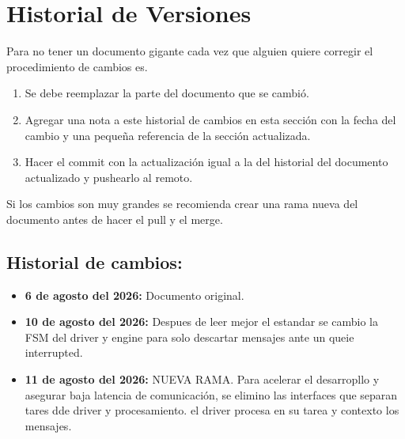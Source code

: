 \thispagestyle{plain}
\chapter[Historial de Versiones]{Historial de Versiones}
\label{cp:historialVersiones}

Para no tener un documento gigante cada vez que alguien quiere corregir el procedimiento de cambios es.
\begin{enumerate}
    \item Se debe reemplazar la parte del documento que se cambió.
    \item Agregar una nota a este historial de cambios en esta sección con la fecha del cambio y una pequeña referencia de la sección actualizada.
    \item Hacer el commit con la actualización igual a la del historial del documento actualizado y pushearlo al remoto.
\end{enumerate}
Si los cambios son muy grandes se recomienda crear una rama nueva del documento antes de hacer el pull y el merge.

\section{Historial de cambios:}
\begin{itemize}
    \item \textbf{ 6 de agosto del 2026:} Documento original. 
    \item \textbf{ 10 de agosto del 2026:} Despues de leer mejor el estandar se cambio la FSM del driver y engine para solo descartar mensajes ante un queie interrupted.
    \item \textbf{ 11 de agosto del 2026:} NUEVA RAMA. Para acelerar el desarropllo y asegurar baja latencia de comunicación, se elimino las interfaces que separan tares dde driver y procesamiento. el driver procesa en su tarea y contexto los mensajes. 
\end{itemize}